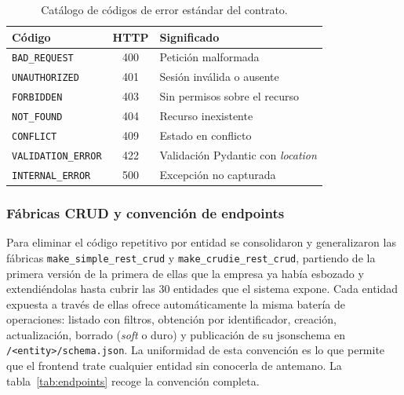 \begin{table}[!htbp]
\caption{Catálogo de códigos de error estándar del contrato.}
\label{tab:errores}
\centering
\begin{tabular}{|l|c|p{6.5cm}|}
\hline
\textbf{Código} & \textbf{HTTP} & \textbf{Significado} \\ \hline
\texttt{BAD\_REQUEST} & 400 & Petición malformada \\ \hline
\texttt{UNAUTHORIZED} & 401 & Sesión inválida o ausente \\ \hline
\texttt{FORBIDDEN} & 403 & Sin permisos sobre el recurso \\ \hline
\texttt{NOT\_FOUND} & 404 & Recurso inexistente \\ \hline
\texttt{CONFLICT} & 409 & Estado en conflicto \\ \hline
\texttt{VALIDATION\_ERROR} & 422 & Validación Pydantic con \emph{location} \\ \hline
\texttt{INTERNAL\_ERROR} & 500 & Excepción no capturada \\ \hline
\end{tabular}
\end{table}

\subsubsection{Fábricas CRUD y convención de endpoints}
Para eliminar el código repetitivo por entidad se consolidaron y generalizaron
las fábricas
\texttt{make\_\allowbreak simple\_\allowbreak rest\_\allowbreak crud} y \texttt{make\_\allowbreak crudie\_\allowbreak rest\_\allowbreak crud},
partiendo de la primera versión de la primera de ellas que la empresa ya había
esbozado y extendiéndolas hasta cubrir las 30 entidades que el sistema expone. Cada
entidad expuesta a través de ellas ofrece automáticamente la misma batería de
operaciones: listado con filtros, obtención por identificador, creación,
actualización, borrado (\emph{soft} o duro) y publicación de su
\gls{jsonschema} en \texttt{/\allowbreak <entity>\allowbreak /\allowbreak schema.\allowbreak json}. La uniformidad de esta
convención es lo que permite que el frontend trate cualquier entidad sin
conocerla de antemano. La tabla~\ref{tab:endpoints} recoge la convención
completa.

